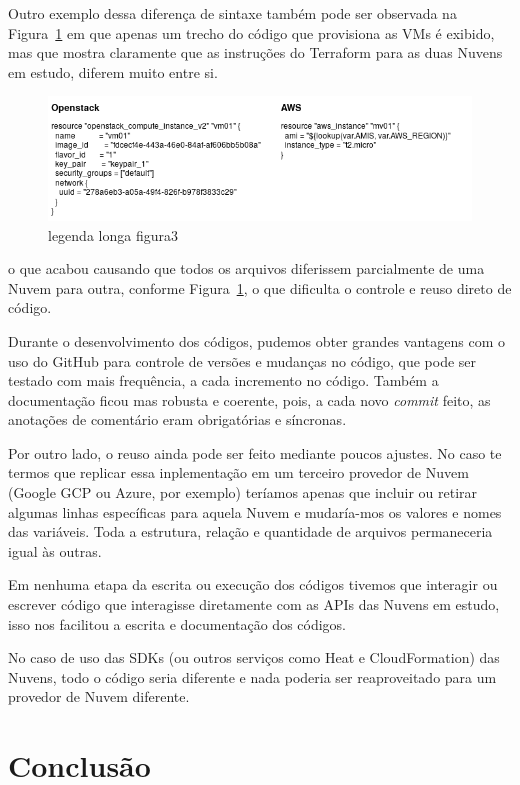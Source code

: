 \documentclass[12pt]{article}
\begin{document}
	Outro exemplo dessa diferença de sintaxe também pode ser observada na Figura~\ref{fig:figure3} em que apenas um trecho do código que provisiona as VMs é exibido, mas que mostra claramente que as instruções do Terraform para as duas Nuvens em estudo, diferem muito entre si.
		
	\begin{figure}[ht]
		\centering
		\includegraphics[width=0.97\linewidth]{figuras/Figure3.png}
		\caption{legenda longa figura3}
		\label{fig:figure3}
	\end{figure}

    o que acabou causando que todos os arquivos diferissem parcialmente de uma Nuvem para outra, conforme Figura~\ref{fig:figure3}, o que dificulta o controle e reuso direto de código.
	
	Durante o desenvolvimento dos códigos, pudemos obter grandes vantagens com o uso do GitHub para controle de versões e mudanças no código, que pode ser testado com mais frequência, a cada incremento no código. Também a documentação ficou mas robusta e coerente, pois, a cada novo \textit{commit} feito, as anotações de comentário eram obrigatórias e síncronas.
	
	Por outro lado, o reuso ainda pode ser feito mediante poucos ajustes. No caso te termos que replicar essa inplementação em um terceiro provedor de Nuvem (Google GCP ou Azure, por exemplo) teríamos apenas que incluir ou retirar algumas linhas específicas para aquela Nuvem e mudaría-mos os valores e nomes das variáveis. Toda a estrutura, relação e quantidade de arquivos permaneceria igual às outras. 
	
	Em nenhuma etapa da escrita ou execução dos códigos tivemos que interagir ou escrever código que interagisse diretamente com as APIs das Nuvens em estudo, isso nos facilitou a escrita e documentação dos códigos.
	
	No caso de uso das SDKs (ou outros serviços como Heat e CloudFormation) das Nuvens, todo o código seria diferente e nada poderia ser reaproveitado para um provedor de Nuvem diferente. 		
	
	\section{Conclusão}
	
\end{document}
